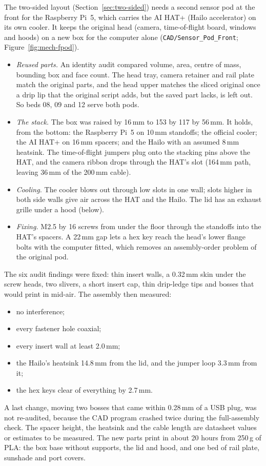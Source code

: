 The two-sided layout (Section~\ref{sec:two-sided}) needs a second sensor pod at the front for the Raspberry Pi~5, which carries the AI HAT+ (Hailo accelerator) on its own cooler. It keeps the original head (camera, time-of-flight board, windows and hoods) on a new box for the computer alone (\texttt{CAD/Sensor\_Pod\_Front}; Figure~\ref{fig:mech-fpod}).

\begin{itemize}
\item \emph{Reused parts.} An identity audit compared volume, area, centre of mass, bounding box and face count. The head tray, camera retainer and rail plate match the original parts, and the head upper matches the sliced original once a drip lip that the original script adds, but the saved part lacks, is left out. So beds 08, 09 and 12 serve both pods.
\item \emph{The stack.} The box was raised by 16\,mm to 153 by 117 by 56\,mm. It holds, from the bottom: the Raspberry Pi~5 on 10\,mm standoffs; the official cooler; the AI HAT+ on 16\,mm spacers; and the Hailo with an assumed 8\,mm heatsink. The time-of-flight jumpers plug onto the stacking pins above the HAT, and the camera ribbon drops through the HAT's slot (164\,mm path, leaving 36\,mm of the 200\,mm cable).
\item \emph{Cooling.} The cooler blows out through low slots in one wall; slots higher in both side walls give air across the HAT and the Hailo. The lid has an exhaust grille under a hood (below).
\item \emph{Fixing.} M2.5 by 16 screws from under the floor through the standoffs into the HAT's spacers. A 22\,mm gap lets a hex key reach the head's lower flange bolts with the computer fitted, which removes an assembly-order problem of the original pod.
\end{itemize}

The six audit findings were fixed: thin insert walls, a 0.32\,mm skin under the screw heads, two slivers, a short insert cap, thin drip-ledge tips and bosses that would print in mid-air. The assembly then measured:
\begin{itemize}
\item no interference;
\item every fastener hole coaxial;
\item every insert wall at least 2.0\,mm;
\item the Hailo's heatsink 14.8\,mm from the lid, and the jumper loop 3.3\,mm from it;
\item the hex keys clear of everything by 2.7\,mm.
\end{itemize}
A last change, moving two bosses that came within 0.28\,mm of a USB plug, was not re-audited, because the CAD program crashed twice during the full-assembly check. The spacer height, the heatsink and the cable length are datasheet values or estimates to be measured. The new parts print in about 20 hours from 250\,g of PLA: the box base without supports, the lid and hood, and one bed of rail plate, sunshade and port covers.


